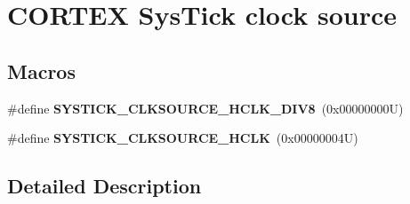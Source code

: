 \hypertarget{group___c_o_r_t_e_x___sys_tick__clock__source}{}\section{C\+O\+R\+T\+EX Sys\+Tick clock source}
\label{group___c_o_r_t_e_x___sys_tick__clock__source}
\subsection*{Macros}
\begin{DoxyCompactItemize}
\item 
\mbox{\label{group___c_o_r_t_e_x___sys_tick__clock__source_ga1fd9b5bada2a8b2425a8523bc0fc7124}} 
\#define {\bfseries S\+Y\+S\+T\+I\+C\+K\+\_\+\+C\+L\+K\+S\+O\+U\+R\+C\+E\+\_\+\+H\+C\+L\+K\+\_\+\+D\+I\+V8}~(0x00000000\+U)
\item 
\mbox{\label{group___c_o_r_t_e_x___sys_tick__clock__source_ga6f6582df23b6fbc578325e453b9893b7}} 
\#define {\bfseries S\+Y\+S\+T\+I\+C\+K\+\_\+\+C\+L\+K\+S\+O\+U\+R\+C\+E\+\_\+\+H\+C\+LK}~(0x00000004\+U)
\end{DoxyCompactItemize}


\subsection{Detailed Description}
